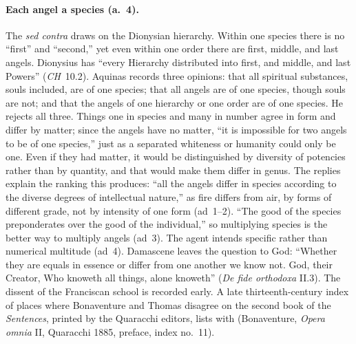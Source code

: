 \paragraph{Each angel a species (a.~4).} The \emph{sed contra} draws on
the Dionysian hierarchy. Within one species there is no ``first'' and
``second,'' yet even within one order there are first, middle, and last
angels. Dionysius has ``every Hierarchy distributed into first, and middle,
and last Powers'' (\emph{CH}~10.2). Aquinas records three opinions: that
all spiritual substances, souls included, are of one species; that all
angels are of one species, though souls are not; and that the angels of
one hierarchy or one order are of one species. He rejects all three. Things
one in species and many in number agree in form and differ by matter; since
the angels have no matter, ``it is impossible for two angels to be of one
species,'' just as a separated whiteness or humanity could only be one.
Even if they had matter, it would be distinguished by diversity of
potencies rather than by quantity, and that would make them differ in
genus. The replies explain the ranking this produces: ``all the angels
differ in species according to the diverse degrees of intellectual
nature,'' as fire differs from air, by forms of different grade, not by
intensity of one form (ad~1--2). ``The good of the species preponderates
over the good of the individual,'' so multiplying species is the better
way to multiply angels (ad~3). The agent intends specific rather than
numerical multitude (ad~4). Damascene leaves the question to God: ``Whether
they are equals in essence or differ from one another we know not. God,
their Creator, Who knoweth all things, alone knoweth'' (\emph{De fide
orthodoxa} II.3). The dissent of the
Franciscan school is recorded early. A late thirteenth-century index of
places where Bonaventure and Thomas disagree on the second book of the
\emph{Sentences}, printed by the Quaracchi editors, lists  with  (Bonaventure, \emph{Opera omnia} II, Quaracchi 1885,
preface, index no.~11).

